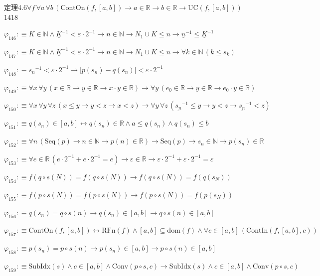 \begin{fullproof}{定理4.6}{$\forall f\,\forall a\,\forall b\,(\mathrm{ContOn}(f,[a,b]) \to a \in \mathbb{R} \to b \in \mathbb{R} \to \mathrm{UC}(f,[a,b]))$}{1418}
\begin{abbrevlist}
\item $\varphi_{146} :\equiv K \in \mathbb{N} \land \underline{K}^{-1} < \varepsilon \cdot 2^{-1} \to n \in \mathbb{N} \to N_{1} \cup K \leq n \to \underline{n}^{-1} \leq \underline{K}^{-1}$
\item $\varphi_{147} :\equiv K \in \mathbb{N} \land \underline{K}^{-1} < \varepsilon \cdot 2^{-1} \to n \in \mathbb{N} \to N_{1} \cup K \leq n \to \forall k \in \mathbb{N}\,(k \leq s_{k})$
\item $\varphi_{148} :\equiv \underline{s_{n}}^{-1} < \varepsilon \cdot 2^{-1} \to \lvert p(s_{n}) - q(s_{n}) \rvert < \varepsilon \cdot 2^{-1}$
\item $\varphi_{149} :\equiv \forall x\,\forall y\,(x \in \mathbb{R} \to y \in \mathbb{R} \to x \cdot y \in \mathbb{R}) \to \forall y\,(e_{0} \in \mathbb{R} \to y \in \mathbb{R} \to e_{0} \cdot y \in \mathbb{R})$
\item $\varphi_{150} :\equiv \forall x\,\forall y\,\forall z\,(x \leq y \to y < z \to x < z) \to \forall y\,\forall z\,(\underline{s_{n}}^{-1} \leq y \to y < z \to \underline{s_{n}}^{-1} < z)$
\item $\varphi_{151} :\equiv q(s_{n}) \in [a,b] \leftrightarrow q(s_{n}) \in \mathbb{R} \land a \leq q(s_{n}) \land q(s_{n}) \leq b$
\item $\varphi_{152} :\equiv \forall n\,(\mathrm{Seq}(p) \to n \in \mathbb{N} \to p(n) \in \mathbb{R}) \to \mathrm{Seq}(p) \to s_{n} \in \mathbb{N} \to p(s_{n}) \in \mathbb{R}$
\item $\varphi_{153} :\equiv \forall e \in \mathbb{R}\,(e \cdot 2^{-1} + e \cdot 2^{-1} = e) \to \varepsilon \in \mathbb{R} \to \varepsilon \cdot 2^{-1} + \varepsilon \cdot 2^{-1} = \varepsilon$
\item $\varphi_{154} :\equiv f(q \circ s(N)) = f(q \circ s(N)) \to f(q \circ s(N)) = f(q(s_{N}))$
\item $\varphi_{155} :\equiv f(p \circ s(N)) = f(p \circ s(N)) \to f(p \circ s(N)) = f(p(s_{N}))$
\item $\varphi_{156} :\equiv q(s_{n}) = q \circ s(n) \to q(s_{n}) \in [a,b] \to q \circ s(n) \in [a,b]$
\item $\varphi_{157} :\equiv \mathrm{ContOn}(f,[a,b]) \leftrightarrow \mathrm{RFn}(f) \land [a,b] \subseteq \mathrm{dom}(f) \land \forall c \in [a,b]\,(\mathrm{ContIn}(f,[a,b],c))$
\item $\varphi_{158} :\equiv p(s_{n}) = p \circ s(n) \to p(s_{n}) \in [a,b] \to p \circ s(n) \in [a,b]$
\item $\varphi_{159} :\equiv \mathrm{SubIdx}(s) \land c \in [a,b] \land \mathrm{Conv}(p \circ s,c) \to \mathrm{SubIdx}(s) \land c \in [a,b] \land \mathrm{Conv}(p \circ s,c)$

\end{abbrevlist}
\end{fullproof}
